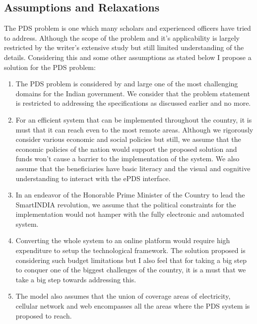 \documentclass{article}
\begin{document}
\subsection{Assumptions and Relaxations}

The PDS problem is one which many scholars and experienced officers have tried to address. Although the scope of the problem and it's applicability is largely restricted by the writer's extensive study but still limited understanding of the details. Considering this and some other assumptions as stated below I propose a solution for the PDS problem:

\begin{enumerate}
\item The PDS problem is considered by and large one of the most challenging domains for the Indian government. We consider that the problem statement is restricted to addressing the specifications as discussed earlier and no more. 
\item For an efficient system that can be implemented throughout the country, it is must that it can reach even to the most remote areas. Although we rigorously consider various economic and social policies but still, we assume that the economic policies of the nation would support the proposed solution and funds won't cause a barrier to the implementation of the system. We also assume that the beneficiaries have basic literacy and the visual and cognitive understanding to interact with the ePDS interface.
\item In an endeavor of the Honorable Prime Minister of the Country to lead the SmartINDIA revolution, we assume that the political constraints for the implementation would not hamper with the fully electronic and automated system.
\item Converting the whole system to an online platform would require high expenditure to setup the technological framework. The solution proposed is considering such budget limitations but I also feel that for taking a big step to conquer one of the biggest challenges of the country, it is a must that we take a big step towards addressing this.
\item The model also assumes that the union of coverage areas of electricity, cellular network and web encompasses all the areas where the PDS system is proposed to reach.
\end{enumerate}
\end{document}
